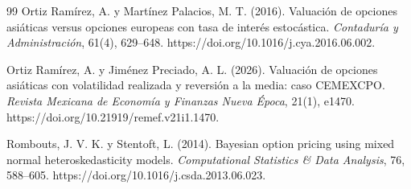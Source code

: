 \begin{thebibliography}{99}
Ortiz Ramírez, A. y Martínez Palacios, M. T. (2016). Valuación de opciones asiáticas versus opciones europeas con tasa de interés estocástica. \textit{Contaduría y Administración}, 61(4), 629--648. https://doi.org/10.1016/j.cya.2016.06.002.

Ortiz Ramírez, A. y Jiménez Preciado, A. L. (2026). Valuación de opciones asiáticas con volatilidad realizada y reversión a la media: caso CEMEXCPO. \textit{Revista Mexicana de Economía y Finanzas Nueva Época}, 21(1), e1470. https://doi.org/10.21919/remef.v21i1.1470.

Rombouts, J. V. K. y Stentoft, L. (2014). Bayesian option pricing using mixed normal heteroskedasticity models. \textit{Computational Statistics \& Data Analysis}, 76, 588--605. https://doi.org/10.1016/j.csda.2013.06.023.

\end{thebibliography}
